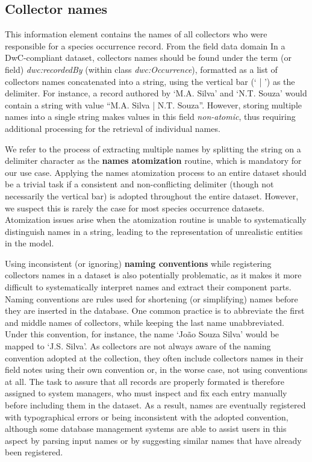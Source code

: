 \subsection{Collector names}\label{section:data_req_collector}
This information element contains the names of all collectors who were responsible for a species occurrence record.
From the field data domain \cite{Dalcin2005} 
In a DwC-compliant dataset, collectors names should be found under the term (or field) \textit{dwc:recordedBy} (within class \textit{dwc:Occurrence}), formatted as a list of collectors names concatenated into a string, using the vertical bar (` | ') as the delimiter.
For instance, a record authored by `M.A. Silva' and `N.T. Souza' would contain a string with value ``M.A. Silva | N.T. Souza''.
However, storing multiple names into a single string makes values in this field \textit{non-atomic}, thus requiring additional processing for the retrieval of individual names.

We refer to the process of extracting multiple names by splitting the string on a delimiter character as the \textbf{names atomization}  routine, which is mandatory for our use case.
Applying the names atomization  process to an entire dataset should be a trivial task if a consistent and non-conflicting delimiter (though not necessarily the vertical bar) is adopted throughout the entire dataset.
However, we suspect this is rarely the case for most species occurrence datasets.
Atomization issues arise when the atomization routine is unable to systematically distinguish names in a string, leading to the representation of unrealistic entities in the model.

Using inconsistent (or ignoring) \textbf{naming conventions} while registering collectors names in a dataset is also potentially problematic, as it makes it more difficult to systematically interpret names and extract their component parts.
Naming conventions are rules used for shortening (or simplifying) names before they are inserted in the database.
One common practice is to abbreviate the first and middle names of collectors, while keeping the last name unabbreviated.
Under this convention, for instance, the name `João Souza Silva' would be mapped to `J.S. Silva'.
As collectors are not always aware of the naming convention adopted at the collection, they often include collectors names in their field notes using their own convention or, in the worse case, not using conventions at all.
The task to assure that all records are properly formated is therefore assigned to system managers, who must inspect and fix each entry manually before including them in the dataset.
As a result, names are eventually registered with typographical errors or being inconsistent with the adopted convention, although some database management systems are able to assist users in this aspect by parsing input names or by suggesting similar names that have already been registered.

